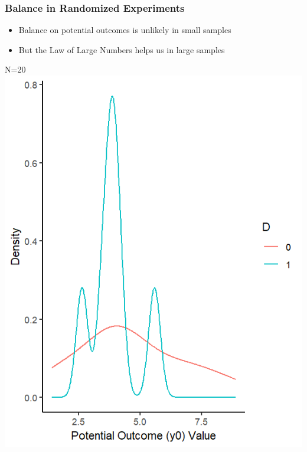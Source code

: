 \documentclass[xcolor=x11names,compress]{beamer}\usepackage[]{graphicx}\usepackage[]{color}
\makeatletter
\def\maxwidth{ %
  \ifdim\Gin@nat@width>\linewidth
    \linewidth
  \else
    \Gin@nat@width
  \fi
}
\newenvironment{knitrout}{}{} %
\renewcommand{\(}{\begin{columns}}
\renewcommand{\)}{\end{columns}}
\newcommand{\<}[1]{\begin{column}{#1}}
\renewcommand{\>}{\end{column}}
\makeatother
\begin{document}
\begin{frame}
\frametitle{Balance in Randomized Experiments}
\begin{multicols}{2}
\begin{itemize}
\item Balance on potential outcomes is unlikely in small samples
\item But the Law of Large Numbers helps us in large samples
\end{itemize}
\columnbreak
N=20
\begin{knitrout}
\color{fgcolor}
\includegraphics[width=\maxwidth]{figure/balance_N2-1} 

\end{knitrout}
\end{multicols}
\end{frame}
\end{document}
